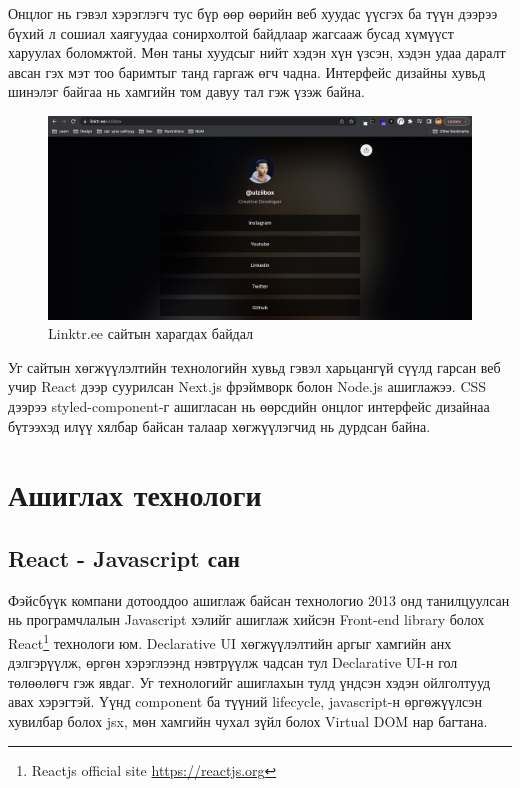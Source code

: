 Онцлог нь гэвэл хэрэглэгч тус бүр өөр өөрийн веб хуудас үүсгэх ба түүн дээрээ бүхий л сошиал хаягуудаа сонирхолтой байдлаар жагсааж бусад хүмүүст харуулах боломжтой. Мөн таны хуудсыг нийт хэдэн хүн үзсэн, хэдэн удаа даралт авсан гэх мэт тоо баримтыг танд гаргаж өгч чадна. Интерфейс дизайны хувьд шинэлэг байгаа нь хамгийн том давуу тал гэж үзэж байна. 

\begin{figure}[h]
	\centering
	\includegraphics[width=15cm]{images/linktree.png}
	\caption{Linktr.ee сайтын харагдах байдал}
	\label{fig:linktree}
\end{figure}

Уг сайтын хөгжүүлэлтийн технологийн хувьд гэвэл харьцангүй сүүлд гарсан веб учир React дээр суурилсан Next.js фрэймворк болон Node.js ашиглажээ. CSS дээрээ styled-component-г ашигласан нь өөрсдийн онцлог интерфейс дизайнаа бүтээхэд илүү хялбар байсан талаар хөгжүүлэгчид нь дурдсан байна.

\section{Ашиглах технологи}

\subsection{React - Javascript сан}

Фэйсбүүк компани дотооддоо ашиглаж байсан технологио 2013 онд танилцуулсан нь програмчлалын Javascript хэлийг ашиглаж хийсэн Front-end library болох React\footnote{Reactjs official site \url{https://reactjs.org}} технологи юм. Declarative UI хөгжүүлэлтийн аргыг хамгийн анх дэлгэрүүлж, өргөн хэрэглээнд нэвтрүүлж чадсан тул Declarative UI-н гол төлөөлөгч гэж явдаг. Уг технологийг ашиглахын тулд үндсэн хэдэн ойлголтууд авах хэрэгтэй. Үүнд component ба түүний lifecycle, javascript-н өргөжүүлсэн хувилбар болох jsx, мөн хамгийн чухал зүйл болох Virtual DOM нар багтана. 

